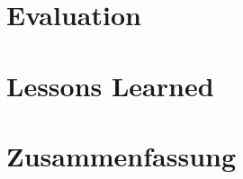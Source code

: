 \documentclass[12pt,ngerman,seminar]{dbvstudentwork}
\begin{document}
	\section{Evaluation}
	\label{sec:evaluation}
		
		
	\section{Lessons Learned}
	\label{sec:lessonslearned}
		
		
	\section{Zusammenfassung}
	\label{sec:summary}
		
	
	
	\singlespacing
	
	\clearpage
	
	\clearpage
	\listoffigures %
	\clearpage
	
\end{document}
